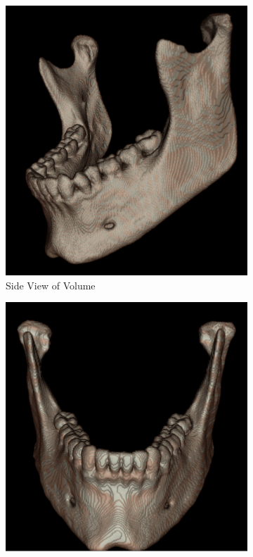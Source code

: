 \documentclass[11.5pt, b5paper]{article}
\begin{document}
\begin{figure}
    \centering
    \begin{subfigure}[b]{0.33\textwidth}
        \centering
        \includegraphics[width=\textwidth]{RCS}
        \caption{Side View of Volume}
    \end{subfigure}
    \hfill
    \begin{subfigure}[b]{0.33\textwidth}
        \centering
        \includegraphics[width=\textwidth]{RCF}

\end{subfigure}
\end{figure}
\end{document}
